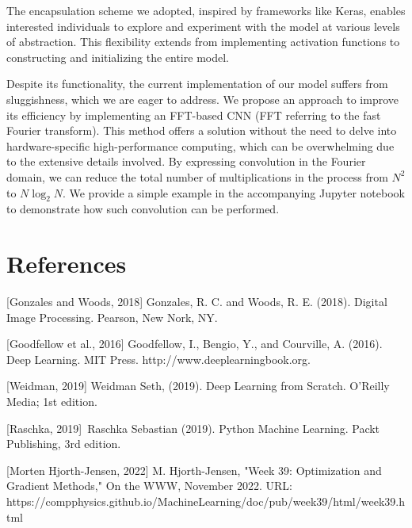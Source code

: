 \documentclass[onecolumn,10pt,cleanfoot]{asme2ej}
\begin{document}
The encapsulation scheme we adopted, inspired by frameworks like Keras, enables interested individuals to explore and experiment with the model at various levels of abstraction. This flexibility extends from implementing activation functions to constructing and initializing the entire model.

Despite its functionality, the current implementation of our model suffers from sluggishness, which we are eager to address. We propose an approach to improve its efficiency by implementing an FFT-based CNN (FFT referring to the fast Fourier transform). This method offers a solution without the need to delve into hardware-specific high-performance computing, which can be overwhelming due to the extensive details involved. By expressing convolution in the Fourier domain, we can reduce the total number of multiplications in the process from $N^2$ to $N\log_2 N$. We provide a simple example in the accompanying Jupyter notebook to demonstrate how such convolution can be performed.

\section{References}
[Gonzales and Woods, 2018] Gonzales, R. C. and Woods, R. E. (2018). Digital Image Processing. Pearson, New Nork, NY.

[Goodfellow et al., 2016] Goodfellow, I., Bengio, Y., and Courville, A. (2016). Deep Learning. MIT Press.
http://www.deeplearningbook.org.

[Weidman, 2019] Weidman Seth, (2019). Deep Learning from Scratch. O'Reilly Media; 1st edition.

[Raschka, 2019] Raschka Sebastian (2019). Python Machine Learning. Packt Publishing, 3rd edition.

[Morten Hjorth-Jensen, 2022] M. Hjorth-Jensen, "Week 39: Optimization and Gradient Methods," On the WWW, November 2022. URL: https://compphysics.github.io/MachineLearning/doc/pub/week39/html/week39.html
\end{document}
